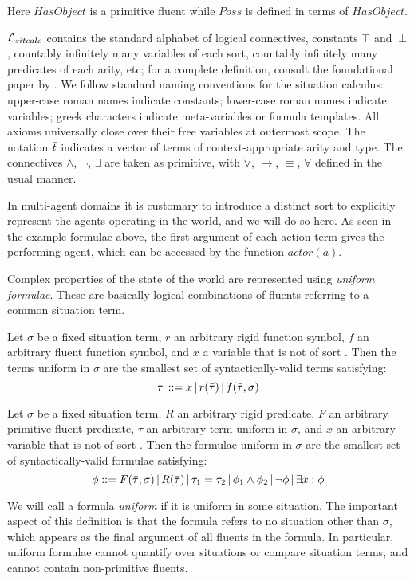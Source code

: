 Here $HasObject$ is a primitive fluent while $Poss$ is defined in
terms of $HasObject$.\medskip{}


$\mathcal{L}_{sitcalc}$ contains the standard alphabet of logical connectives, constants
$\top$ and $\ \bot$, countably infinitely many variables of each
sort, countably infinitely many predicates of each arity, etc; for
a complete definition, consult the foundational paper by \citet{pirri99contributions_sitcalc}.
We follow standard naming conventions for the situation calculus:
upper-case roman names indicate constants; lower-case roman names
indicate variables; greek characters indicate meta-variables or formula
templates. All axioms universally close over their free variables
at outermost scope. The notation $\bar{t}$ indicates a vector of
terms of context-appropriate arity and type. The connectives $\wedge$,
$\neg$, $\exists$ are taken as primitive, with $\vee$, $\rightarrow$,
$\equiv$, $\forall$ defined in the usual manner.

In multi-agent domains it is customary to introduce a distinct sort
 to explicitly represent the agents operating in the world,
and we will do so here. As seen in the example formulae above, the
first argument of each action term gives the performing agent, which
can be accessed by the function $actor(a)$.

Complex properties of the state of the world are represented using
\emph{uniform formulae}. These are basically logical combinations
of fluents referring to a common situation term.

\begin{defnL}
 Let $\sigma$ be a fixed situation term,
$r$ an arbitrary rigid function symbol, $f$ an arbitrary fluent
function symbol, and $x$ a variable that is not of sort .
Then the terms uniform in $\sigma$ are the smallest set of syntactically-valid
terms satisfying:\[
\tau\,::=x\,|\, r(\bar{\tau})\,|\, f(\bar{\tau},\sigma)\]

\begin{defnL}
 Let $\sigma$ be a fixed situation
term, $R$ an arbitrary rigid predicate, $F$ an arbitrary primitive
fluent predicate, $\tau$ an arbitrary term uniform in $\sigma$,
and $x$ an arbitrary variable that is not of sort .
Then the formulae uniform in $\sigma$ are the smallest set of syntactically-valid
formulae satisfying:\[
\phi::=F(\bar{\tau},\sigma)\,|\, R(\bar{\tau})\,|\,\tau_{1}=\tau_{2}\,|\,\phi_{1}\wedge\phi_{2}\,|\,\neg\phi\,|\,\exists x:\phi\]

\end{defnL}
\end{defnL}
We will call a formula \emph{uniform} if it is uniform in some situation.
The important aspect of this definition is that the formula refers
to no situation other than $\sigma$, which appears as the final argument
of all fluents in the formula. In particular, uniform formulae cannot
quantify over situations or compare situation terms, and cannot contain
non-primitive fluents.

